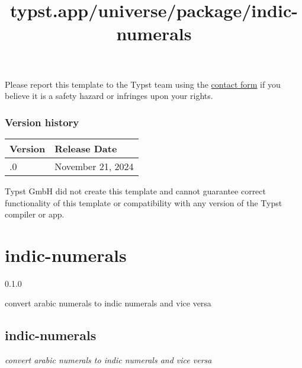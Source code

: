 Please report this template to the Typst team using the
\href{https://typst.app/contact}{contact form} if you believe it is a
safety hazard or infringes upon your rights.

\label{versions}
\subsubsection{Version history}\label{version-history}

\begin{longtable}[]{@{}ll@{}}
\toprule\noalign{}
Version & Release Date \\
\midrule\noalign{}
\endhead
\bottomrule\noalign{}
\endlastfoot
0.1.0 & November 21, 2024 \\
\end{longtable}

Typst GmbH did not create this template and cannot guarantee correct
functionality of this template or compatibility with any version of the
Typst compiler or app.


\title{typst.app/universe/package/indic-numerals}

\label{banner}
\section{indic-numerals}\label{indic-numerals}

{ 0.1.0 }

convert arabic numerals to indic numerals and vice versa

\label{readme}
\href{https://github.com/cecoeco/indic-numerals/blob/main/LICENSE.md}{\pandocbounded{}}

\subsection{indic-numerals}\label{indic-numerals-1}

\emph{convert arabic numerals to indic numerals and vice versa}

\begin{Shaded}
\begin{Highlighting}[]


\end{Highlighting}
\end{Shaded}

